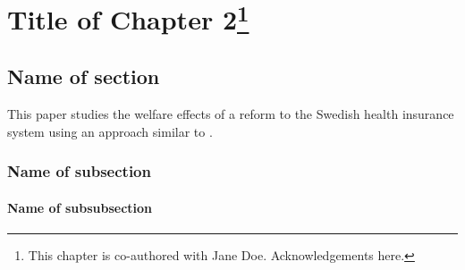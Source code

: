 \graphicspath{{3_chapter/figures/}}

\renewcommand*{\thefootnote}{\fnsymbol{footnote}}
\chapter[Title of Chapter 2]{Title of Chapter 2\footnote{\noindent This chapter is co-authored with Jane Doe.
Acknowledgements here.}}
\label{chapter:chapter2-alias}
\newpage

\setcounter{footnote}{0}
\renewcommand*{\thefootnote}{\arabic{footnote}}

\section{\label{}Name of section}

This paper studies the welfare effects of a reform to the Swedish health insurance system using an approach similar to \citet{einav2010estimating}. \lipsum[1-2]



\lipsum[3-4]

\subsection{\label{}Name of subsection}

\lipsum[5-6]



\lipsum[7-8]

\subsubsection{\label{}Name of subsubsection}

\lipsum[9-10]

\newpage
\printbibliography[segment=0,heading=subbibintoc]

\newpage
\begin{subappendices}
\newrefsegment %

\end{subappendices}
